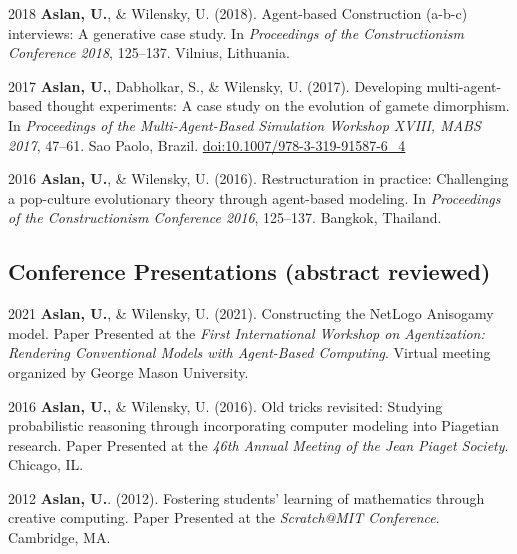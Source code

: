 \documentclass[11pt,letterpaper]{report} %
\begin{document}
\begin{tablist}
        \item[2018] \tab{}\textbf{Aslan, U.}, \& Wilensky, U. (2018). Agent-based Construction (a-b-c) interviews: A generative case study. In \textit{Proceedings of the Constructionism Conference 2018}, 125--137. Vilnius, Lithuania.

        \item[2017] \tab{}\textbf{Aslan, U.}, Dabholkar, S., \& Wilensky, U. (2017). Developing multi-agent-based thought experiments: A case study on the evolution of gamete dimorphism. In \textit{Proceedings of the Multi-Agent-Based Simulation Workshop XVIII, MABS 2017}, 47--61. Sao Paolo, Brazil. \href{https://doi.org/10.1007/978-3-319-91587-6\_4}{doi:10.1007/978-3-319-91587-6\_4}

        \item[2016] \tab{}\textbf{Aslan, U.}, \& Wilensky, U. (2016). Restructuration in practice: Challenging a pop-culture evolutionary theory through agent-based modeling. In \textit{Proceedings of the Constructionism Conference 2016}, 125--137. Bangkok, Thailand.


    \end{tablist}

    \subsection*{Conference Presentations (abstract reviewed)}

    \begin{tablist}

        \item[2021] \tab{}\textbf{Aslan, U.}, \& Wilensky, U. (2021). Constructing the NetLogo Anisogamy model. Paper Presented at the \textit{First International Workshop on Agentization: Rendering Conventional Models with Agent-Based Computing}. Virtual meeting organized by George Mason University.

        \item[2016] \tab{}\textbf{Aslan, U.}, \& Wilensky, U. (2016). Old tricks revisited: Studying probabilistic reasoning through incorporating computer modeling into Piagetian research. Paper Presented at the \textit{46th Annual Meeting of the Jean Piaget Society}. Chicago, IL.

        \item[2012] \tab{}\textbf{Aslan, U.}. (2012). Fostering students' learning of mathematics through creative computing. Paper Presented at the \textit{Scratch@MIT Conference}. Cambridge, MA.

    \end{tablist}
\end{document}
